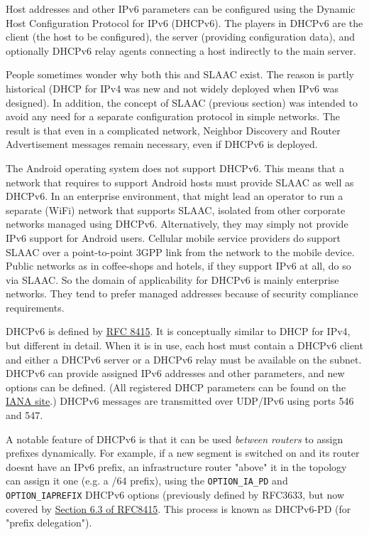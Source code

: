 \documentclass[
]{article}
\begin{document}
Host addresses and other IPv6 parameters can be configured using the
Dynamic Host Configuration Protocol for IPv6 (DHCPv6). The players in
DHCPv6 are the client (the host to be configured), the server (providing
configuration data), and optionally DHCPv6 relay agents connecting a
host indirectly to the main server.

People sometimes wonder why both this and SLAAC exist. The reason is
partly historical (DHCP for IPv4 was new and not widely deployed when
IPv6 was designed). In addition, the concept of SLAAC (previous section)
was intended to avoid any need for a separate configuration protocol in
simple networks. The result is that even in a complicated network,
Neighbor Discovery and Router Advertisement messages remain necessary,
even if DHCPv6 is deployed.

The Android operating system does not support DHCPv6. This means that a
network that requires to support Android hosts must provide SLAAC as
well as DHCPv6. In an enterprise environment, that might lead an
operator to run a separate (WiFi) network that supports SLAAC, isolated
from other corporate networks managed using DHCPv6. Alternatively, they
may simply not provide IPv6 support for Android users. Cellular mobile
service providers do support SLAAC over a point-to-point 3GPP link from
the network to the mobile device. Public networks as in coffee-shops and
hotels, if they support IPv6 at all, do so via SLAAC. So the domain of
applicability for DHCPv6 is mainly enterprise networks. They tend to
prefer managed addresses because of security compliance requirements.

DHCPv6 is defined by \href{https://www.rfc-editor.org/info/rfc8415}{RFC
8415}. It is conceptually similar to DHCP for IPv4, but different in
detail. When it is in use, each host must contain a DHCPv6 client and
either a DHCPv6 server or a DHCPv6 relay must be available on the
subnet. DHCPv6 can provide assigned IPv6 addresses and other parameters,
and new options can be defined. (All registered DHCP parameters can be
found on the
\href{https://www.iana.org/assignments/dhcpv6-parameters/dhcpv6-parameters.xhtml\#dhcpv6-parameters-2}{IANA
site}.) DHCPv6 messages are transmitted over UDP/IPv6 using ports 546
and 547.

A notable feature of DHCPv6 is that it can be used \emph{between
routers} to assign prefixes dynamically. For example, if a new segment
is switched on and its router doesn\textquotesingle t have an IPv6
prefix, an infrastructure router "above" it in the topology can assign
it one (e.g. a /64 prefix), using the \texttt{OPTION\_IA\_PD} and
\texttt{OPTION\_IAPREFIX} DHCPv6 options (previously defined by RFC3633,
but now covered by
\href{https://www.rfc-editor.org/rfc/rfc8415.html\#section-6.3}{Section
6.3 of RFC8415}. This process is known as DHCPv6-PD (for "prefix
delegation").
\end{document}
